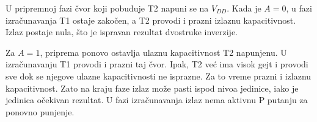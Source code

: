 U pripremnoj fazi čvor koji pobuđuje T2 napuni se na $V_{DD}$. Kada je $A=0$, u fazi izračunavanja T1 ostaje zakočen, a T2 provodi i prazni izlaznu kapacitivnost. Izlaz postaje nula, što je ispravan rezultat dvostruke inverzije.

Za $A=1$, priprema ponovo ostavlja ulaznu kapacitivnost T2 napunjenu. U izračunavanju T1 provodi i prazni taj čvor. Ipak, T2 već ima visok gejt i provodi sve dok se njegove ulazne kapacitivnosti ne isprazne. Za to vreme prazni i izlaznu kapacitivnost. Zato na kraju faze izlaz može pasti ispod nivoa jedinice, iako je jedinica očekivan rezultat. U fazi izračunavanja izlaz nema aktivnu P putanju za ponovno punjenje.
